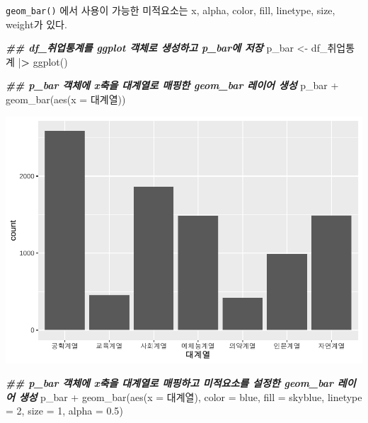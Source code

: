 \documentclass[
]{article}
\newenvironment{Shaded}{\begin{snugshade}}{\end{snugshade}}
\newcommand{\AttributeTok}[1]{\textcolor[rgb]{0.77,0.63,0.00}{#1}}
\newcommand{\DecValTok}[1]{\textcolor[rgb]{0.00,0.00,0.81}{#1}}
\newcommand{\DocumentationTok}[1]{\textcolor[rgb]{0.56,0.35,0.01}{\textbf{\textit{#1}}}}
\newcommand{\ErrorTok}[1]{\textcolor[rgb]{0.64,0.00,0.00}{\textbf{#1}}}
\newcommand{\FloatTok}[1]{\textcolor[rgb]{0.00,0.00,0.81}{#1}}
\newcommand{\FunctionTok}[1]{\textcolor[rgb]{0.00,0.00,0.00}{#1}}
\newcommand{\NormalTok}[1]{#1}
\newcommand{\OtherTok}[1]{\textcolor[rgb]{0.56,0.35,0.01}{#1}}
\newcommand{\SpecialCharTok}[1]{\textcolor[rgb]{0.00,0.00,0.00}{#1}}
\newcommand{\StringTok}[1]{\textcolor[rgb]{0.31,0.60,0.02}{#1}}
\begin{document}
\texttt{geom\_bar()} 에서 사용이 가능한 미적요소는 x, alpha, color, fill, linetype, size, weight가 있다.

\begin{Shaded}
\begin{Highlighting}[]
\DocumentationTok{\#\#  df\_취업통계를 ggplot 객체로 생성하고 p\_bar에 저장}
\NormalTok{p\_bar }\OtherTok{\textless{}{-}}\NormalTok{ df\_취업통계 }\SpecialCharTok{|}\ErrorTok{\textgreater{}}
  \FunctionTok{ggplot}\NormalTok{()}

\DocumentationTok{\#\# p\_bar 객체에 x축을 대계열로 매핑한 geom\_bar 레이어 생성 }
\NormalTok{p\_bar }\SpecialCharTok{+}
  \FunctionTok{geom\_bar}\NormalTok{(}\FunctionTok{aes}\NormalTok{(}\AttributeTok{x =}\NormalTok{ 대계열))}
\end{Highlighting}
\end{Shaded}

\includegraphics{chap3_files/figure-latex/unnamed-chunk-26-1.pdf}

\begin{Shaded}
\begin{Highlighting}[]
\DocumentationTok{\#\# p\_bar 객체에 x축을 대계열로 매핑하고 미적요소를 설정한 geom\_bar 레이어 생성}
\NormalTok{p\_bar }\SpecialCharTok{+}
  \FunctionTok{geom\_bar}\NormalTok{(}\FunctionTok{aes}\NormalTok{(}\AttributeTok{x =}\NormalTok{ 대계열), }\AttributeTok{color =} \StringTok{\textquotesingle{}blue\textquotesingle{}}\NormalTok{, }\AttributeTok{fill =} \StringTok{\textquotesingle{}skyblue\textquotesingle{}}\NormalTok{, }\AttributeTok{linetype =} \DecValTok{2}\NormalTok{, }\AttributeTok{size =} \DecValTok{1}\NormalTok{, }\AttributeTok{alpha =} \FloatTok{0.5}\NormalTok{)}
\end{Highlighting}
\end{Shaded}
\end{document}
